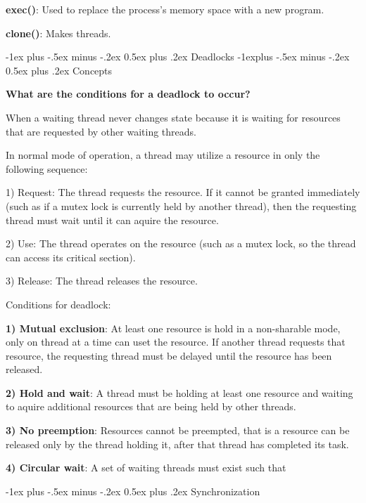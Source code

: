 \documentclass[8pt,landscape]{article}
\makeatletter
\renewcommand{\section}{\@startsection{section}{1}{0mm}%
                                {-1ex plus -.5ex minus -.2ex}%
                                {0.5ex plus .2ex}%
                                {\normalfont\footnotesize\bfseries}}
\renewcommand{\subsection}{\@startsection{subsection}{2}{0mm}%
                                {-1explus -.5ex minus -.2ex}%
                                {0.5ex plus .2ex}%
                                {\normalfont\scriptsize\bfseries}}
\makeatother
\begin{document}
\begin{multicols}{3}
\begin{tiny}
\textbf{exec()}: Used to replace the process's memory space with a new program.

\textbf{clone()}: Makes threads.

\section{Deadlocks}
\subsection{Concepts}

\textbf{What are the conditions for a deadlock to occur?}

When a waiting thread never changes state because it is waiting for resources that are requested by other 
waiting threads.

In normal mode of operation, a thread may utilize a resource in only the following sequence:

1) Request: The thread requests the resource. If it cannot be granted immediately (such as if a mutex lock
is currently held by another thread), then the requesting thread must wait until it can aquire the resource.

2) Use: The thread operates on the resource (such as a mutex lock, so the thread can access its 
critical 
section).

3) Release: The thread releases the resource.

Conditions for deadlock:

\textbf{1) Mutual exclusion}: At least one resource is hold in a non-sharable mode, only on thread 
at a time can uset the resource. If another thread requests that resource, the requesting thread 
must be delayed until the resource has been released.

\textbf{2) Hold and wait}: A thread must be holding at least one resource and waiting to aquire additional resources that are being held by other threads.

\textbf{3) No preemption}: Resources cannot be preempted, that is a resource can be released only 
by the thread holding it, after that thread has completed its task.

\textbf{4) Circular wait}: A set of waiting threads must exist such that 

\section{Synchronization}


\end{tiny}
\end{multicols}
\end{document}
